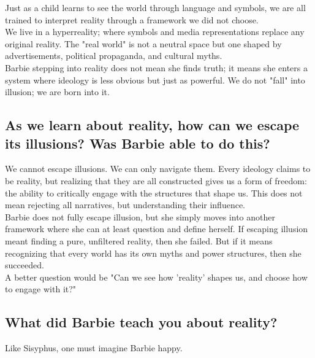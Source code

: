 Just as a child learns to see the world through language and symbols, 
we are all trained to interpret reality through a framework we did not choose. \\

We live in a hyperreality; where symbols and media representations 
replace any original reality. The "real world" is not a neutral space 
but one shaped by advertisements, political propaganda, and cultural myths. \\

Barbie stepping into reality does not mean she finds truth; 
it means she enters a system where ideology is less obvious but just as powerful. 
We do not "fall" into illusion; we are born into it. \\

\subsection{As we learn about reality, how can we escape its illusions? Was Barbie able to do this?}
We cannot escape illusions. We can only navigate them. Every ideology claims to be reality, 
but realizing that they are all constructed gives us a form of freedom: the ability to 
critically engage with the structures that shape us. This does not mean rejecting all narratives, 
but understanding their influence. \\

Barbie does not fully escape illusion, but she simply moves into another framework where she can 
at least question and define herself. If escaping illusion meant finding a pure, unfiltered reality, 
then she failed. But if it means recognizing that every world has its own myths and power structures, 
then she succeeded. \\

A better question would be "Can we see how 'reality' shapes us, and choose how to engage with it?" \\

\subsection{What did Barbie teach you about reality?}

Like Sisyphus, one must imagine Barbie happy. \\